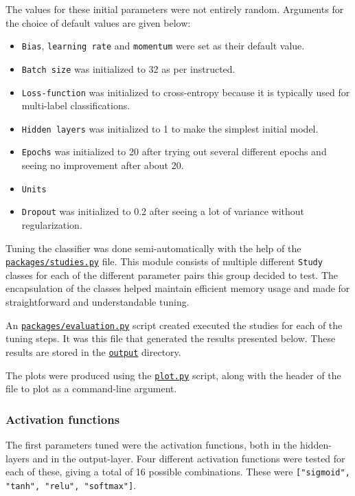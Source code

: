 The values for these initial parameters were not entirely random. Arguments for the choice of default values are given below:

\begin{itemize}
    \item \texttt{Bias}, \texttt{learning rate} and \texttt{momentum} were set as their default value.
    \item \texttt{Batch size} was initialized to 32 as per instructed.
    \item \texttt{Loss-function} was initialized to cross-entropy because it is typically used for multi-label classifications.
    \item \texttt{Hidden layers} was initialized to 1 to make the simplest initial model.
    \item \texttt{Epochs} was initialized to 20 after trying out several different epochs and seeing no improvement after about 20.
    \item \texttt{Units}
    \item \texttt{Dropout} was initialized to 0.2 after seeing a lot of variance without regularization.
\end{itemize}

Tuning the classifier was done semi-automatically with the help of the \href{https://github.uio.no/fabior/IN5550/blob/master/Oblig1/packages/studies.py}{\texttt{packages/studies.py}} file. This module consists of multiple different \texttt{Study} classes for each of the different parameter pairs this group decided to test. The encapsulation of the classes helped maintain efficient memory usage and made for straightforward and understandable tuning. 

An \href{https://github.uio.no/fabior/IN5550/blob/master/Oblig1/packages/evaluation.py}{\texttt{packages/evaluation.py}} script created executed the studies for each of the tuning steps. It was this file that generated the results presented below. These results are stored in the \href{https://github.uio.no/fabior/IN5550/blob/master/Oblig1/output}{\texttt{output}} directory. 

The plots were produced using the \href{https://github.uio.no/fabior/IN5550/blob/master/Oblig1/plot.py}{\texttt{plot.py}} script, along with the header of the file to plot as a command-line argument.


\subsubsection{Activation functions}
\quad The first parameters tuned were the activation functions, both in the hidden-layers and in the output-layer. Four different activation functions were tested for each of these, giving a total of 16 possible combinations. These were \texttt{["sigmoid", "tanh", "relu", "softmax"]}. 


